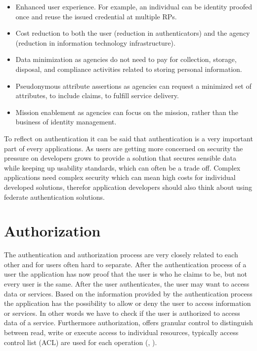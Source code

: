 \begin{itemize}
\item Enhanced user experience. For example, an individual can be identity proofed once and reuse the issued credential at multiple RPs. 
\item Cost reduction to both the user (reduction in authenticators) and the agency (reduction in information technology infrastructure). 
\item Data minimization as agencies do not need to pay for collection, storage, disposal, and compliance activities related to storing personal information. 
\item Pseudonymous attribute assertions as agencies can request a minimized set of attributes, to include claims, to fulfill service delivery. 
\item Mission enablement as agencies can focus on the mission, rather than the business of identity management.
\end{itemize}

To reflect on authentication it can be said that authentication is a very important part of every applications. As users are getting more concerned on security the pressure on developers grows to provide a solution that secures sensible data while keeping up usability standards, which can often be a trade off. Complex applications need complex security which can mean high costs for individual developed solutions, therefor application developers should also think about using federate authentication solutions. 


\section{Authorization}


The authentication and authorization process are very closely related to each other and for users often hard to separate. After the authentication process of a user the application has now proof that the user is who he claims to be, but not every user is the same. After  the user authenticates, the user may want to access data or services. Based on the information provided by the authentication process the application has the possibility to allow or deny the user to access information or services. In other words we have to check if the user is authorized to access data of a service. Furthermore authorization, offers granular control to distinguish between read, write or execute access to individual resources, typically access control list (ACL) are used for each operation (\cite{Todorov:2007:MUI}, \cite{Boyed:2012:GSOA}).

